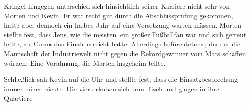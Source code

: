 \par

Kringel hingegen unterschied sich hinsichtlich seiner Karriere nicht sehr von Morten und Kevin. Er war recht gut durch die Abschlussprüfung gekommen, hatte aber dennoch ein halbes Jahr auf eine Versetzung warten müssen. Morten stellte fest, dass Jens, wie die meisten, ein großer Fußballfan war und sich gefreut hatte, als Corna das Finale erreicht hatte. Allerdings befürchtete er, dass es die Mannschaft der Industriewelt nicht gegen die Rekordgewinner vom Mars schaffen würden; Eine Vorahnung, die Morten insgeheim teilte.

\par

Schließlich sah Kevin auf die Uhr und stellte fest, dass die Einsatzbesprechung immer näher rückte. Die vier erhoben sich vom Tisch und gingen in ihre Quartiere.
